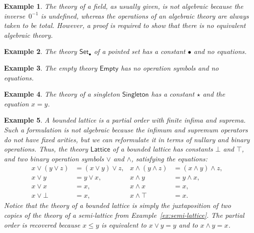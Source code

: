 \documentclass{amsart}
\newcommand{\theory}[1]{\mathsf{#1}} %
\newtheorem{example}{Example}[section]
\begin{document}
\begin{example}
  \label{ex:field}
  The theory of a field, as usually given, is not algebraic because the inverse~$0^{-1}$
  is undefined, whereas the operations of an algebraic theory are always taken to be
  total. However, a proof is required to show that there is no equivalent algebraic theory.
\end{example}

\begin{example}
  \label{ex:pointed-set}
  The theory $\theory{Set_\bullet}$ of a \emph{pointed set} has a constant $\bullet$ and
  no equations.
\end{example}

\begin{example}
  \label{ex:theory-empty}
  The \emph{empty theory $\theory{Empty}$} has no operation symbols and no equations.
\end{example}

\begin{example}
  \label{ex:theory-singleton}
  The theory of a \emph{singleton $\theory{Singleton}$} has a constant $\star$ and the
  equation $x = y$.
\end{example}

\begin{example}
  \label{ex:lattice}
  A bounded lattice is a partial order with finite infima and suprema. Such a formulation
  is not algebraic because the infimum and supremum operators do not have fixed arities,
  but we can reformulate it in terms of nullary and binary operations. Thus, the theory
  $\theory{Lattice}$ of a bounded lattice has constants $\bot$ and $\top$, and two binary
  operation symbols $\vee$ and $\wedge$, satisfying the equations:
  \begin{align*}
    x \vee (y \vee z) &= (x \vee y) \vee z,   &      x \wedge (y \wedge z) &= (x \wedge y) \wedge z,\\
    x \vee y &= y \vee x,                     &      x \wedge y &= y \wedge x,\\
    x \vee x &= x,                            &      x \wedge x &= x,\\
    x \vee \bot &= x,                         &      x \wedge \top &= x.
  \end{align*}
  Notice that the theory of a bounded lattice is simply the juxtaposition of two copies of
  the theory of a semi-lattice from Example~\ref{ex:semi-lattice}. The partial order is
  recovered because $x \leq y$ is equivalent to $x \vee y = y$ and to $x \wedge y = x$.
\end{example}
\end{document}
